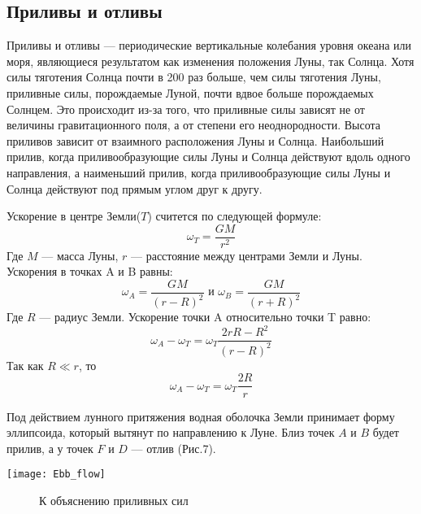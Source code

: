 \subsection{Приливы и отливы}

Приливы и отливы --- периодические вертикальные колебания уровня океана или моря, являющиеся результатом как изменения положения Луны, так Солнца. Хотя силы тяготения Солнца почти в 200 раз больше, чем силы тяготения Луны, приливные силы, порождаемые Луной, почти вдвое больше порождаемых Солнцем. Это происходит из-за того, что приливные силы зависят не от величины гравитационного поля, а от степени его неоднородности. Высота приливов зависит от взаимного расположения Луны и Солнца. Наибольший прилив, когда приливообразующие силы Луны и Солнца действуют вдоль одного направления, а наименьший прилив, когда приливообразующие силы Луны и Солнца действуют под прямым углом друг к другу.

Ускорение в центре Земли($T$) считется по следующей формуле: \begin{equation}\omega_T=\frac{GM}{r^2}
\end{equation}
Где $M$ --- масса Луны, $r$ --- расстояние между центрами Земли и Луны. Ускорения в точках A и B равны:
\begin{equation}\omega_A=\frac{GM}{(r-R)^2} \text{ и } \omega_B=\frac{GM}{(r+R)^2}
\end{equation}
Где $R$ --- радиус Земли. Ускорение точки A относительно точки T равно:
\begin{equation}\omega_A-\omega_T=\omega_T\frac{2rR-R^2}{(r-R)^2}
\end{equation}
Так как $R\ll r$, то \begin{equation}\omega_A-\omega_T=\omega_T\frac{2R}{r}
\end{equation}

Под действием лунного притяжения водная оболочка Земли принимает форму эллипсоида, который вытянут по направлению к Луне. Близ точек $A$ и $B$ будет прилив, а у точек $F$ и $D$ --- отлив (Рис.7).
\begin{center}
\texttt{[image: Ebb\_flow]}
\begin{figure}[h!]
\caption{К объяснению приливных сил}
\end{figure}
\end{center}
